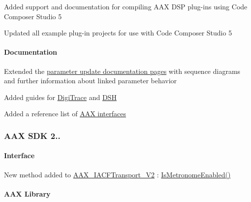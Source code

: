 \begin{DoxyItemize}
\item Added support and documentation for compiling A\+A\+X D\+S\+P plug-\/ins using Code Composer Studio 5 
\item Updated all example plug-\/in projects for use with Code Composer Studio 5 
\end{DoxyItemize}\hypertarget{a00375_aax_sdk_2p1p1_Documentation}{}\paragraph{Documentation}\label{a00375_aax_sdk_2p1p1_Documentation}

\begin{DoxyItemize}
\item Extended the \hyperlink{a00350}{parameter update documentation pages} with sequence diagrams and further information about linked parameter behavior 
\item Added guides for \hyperlink{a00364}{Digi\+Trace} and \hyperlink{a00365}{D\+S\+H} 
\item Added a reference list of \hyperlink{a00003}{A\+A\+X interfaces} 
\end{DoxyItemize}\hypertarget{a00375_aax_sdk_2p1p0}{}\subsubsection{A\+A\+X S\+D\+K 2..}\label{a00375_aax_sdk_2p1p0}
\hypertarget{a00375_aax_sdk_2p1p0_Interface}{}\paragraph{Interface}\label{a00375_aax_sdk_2p1p0_Interface}

\begin{DoxyItemize}
\item New method added to \hyperlink{a00083}{A\+A\+X\+\_\+\+I\+A\+C\+F\+Transport\+\_\+\+V2} \+: \hyperlink{a00083_a64bc3e6707297e32190e7aa290513521}{Is\+Metronome\+Enabled()} 
\end{DoxyItemize}\hypertarget{a00375_aax_sdk_2p1p0_AAXLibrary}{}\paragraph{A\+A\+X Library}\label{a00375_aax_sdk_2p1p0_AAXLibrary}

